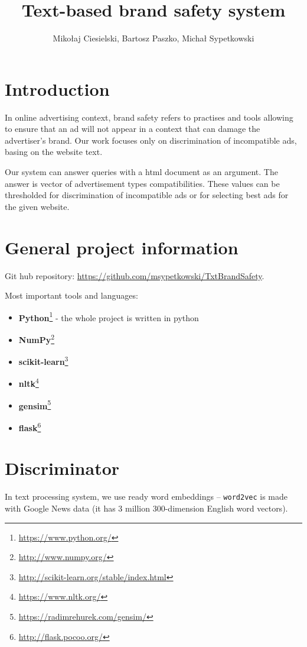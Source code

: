 \documentclass[a4paper]{article}
\begin{document}
\title{Text-based brand safety system}

\author{Mikołaj Ciesielski, Bartosz Paszko, Michał Sypetkowski}
\maketitle

\section{Introduction}

In online advertising context,
brand safety refers to practises and tools allowing to ensure that
an ad will not appear in a context that can damage the advertiser’s brand.
Our work focuses only on discrimination of incompatible ads, basing on
the website text.

Our system can answer queries with a html document as an argument.
The answer is vector of advertisement types compatibilities.
These values can be thresholded for discrimination of incompatible
ads or for selecting best ads for the given website.




\section{General project information}

Git hub repository: \url{https://github.com/msypetkowski/TxtBrandSafety}.

Most important tools and languages:
\begin{itemize}
    \item \textbf{Python}\footnote{\url{https://www.python.org/}}
        - the whole project is written in python
    \item \textbf{NumPy}\footnote{\url{http://www.numpy.org/}}
    \item \textbf{scikit-learn}\footnote{\url{http://scikit-learn.org/stable/index.html}}
    \item \textbf{nltk}\footnote{\url{https://www.nltk.org/}}
    \item \textbf{gensim}\footnote{\url{https://radimrehurek.com/gensim/}}
    \item \textbf{flask}\footnote{\url{http://flask.pocoo.org/}}
\end{itemize}


\section{Discriminator}
In text processing system, we use ready word embeddings --
\texttt{word2vec} is made with Google News data (it has 3 million 300-dimension English word vectors).
\end{document}
